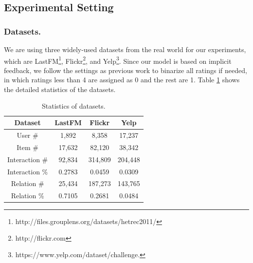 \documentclass[letterpaper]{article} %
\begin{document}
\subsection{Experimental Setting}
\subsubsection{Datasets.}
We are using three widely-used datasets from the real world for our experiments, which are LastFM\footnote{http://files.grouplens.org/datasets/hetrec2011/}, Flickr\footnote{http://flickr.com}, and Yelp\footnote{https://www.yelp.com/dataset/challenge.}. Since our model is based on implicit feedback, we follow the settings as previous work \cite{MHCN} to binarize all ratings if needed, in which ratings less than 4 are assigned as 0 and the rest are 1. Table \ref{table_data} shows the detailed statistics of the datasets. 
\begin{table}[ht]
    \centering
    \begin{tabular}{c|ccc}
    \hline
    Dataset            & LastFM    & Flickr    & Yelp     \\ \hline\hline
    User \#            &1,892      &8,358      &17,237    \\
    Item \#            &17,632     &82,120     &38,342    \\
    Interaction \#     &92,834     &314,809    &204,448   \\  
    Interaction \%        &0.2783     &0.0459     &0.0309    \\
    Relation \#        &25,434     &187,273    &143,765   \\ 
    Relation \%          &0.7105     &0.2681     &0.0484    \\\hline
    \end{tabular}
    \caption{Statistics of datasets.}
    \label{table_data}
\end{table}
\end{document}
